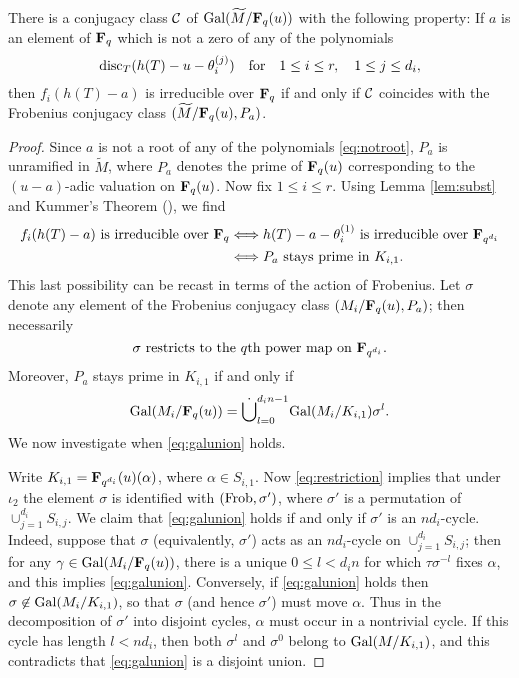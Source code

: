 \documentclass[a4paper]{compositio}
\begin{document}
\begin{lem}\label{lem:class} There is a conjugacy class $\mathcal{C}$ of $\mathrm{Gal}(\widetilde{M}/\mathbf{F}_{q}(u))$ with the following
property: If $a$ is an element of $\mathbf{F}_q$ which is not a zero of any
of the polynomials \begin{equation}\label{eq:notroot}
 \mathrm{disc}_{T}(h(T)-u-\theta_{i}^{(j)}) \quad \text{for}\quad  1 \leq i \leq
 r,\quad
1 \leq j \leq d_i, \end{equation} then $f_i(h(T)-a)$ is irreducible
over $\mathbf{F}_q$ if and only if $\mathcal{C}$ coincides with the Frobenius
conjugacy class $(\widetilde{M}/\mathbf{F}_{q}(u), P_a)$.
\end{lem}
\begin{proof} Since $a$ is not a root of any of the polynomials
\eqref{eq:notroot}, $P_a$ is unramified in $\widetilde{M}$, where
$P_a$ denotes the prime of $\mathbf{F}_q(u)$ corresponding to the
$(u-a)$-adic valuation on $\mathbf{F}_q(u)$. Now fix $1 \leq i \leq r$.
Using Lemma \ref{lem:subst} and Kummer's Theorem (\cite[Theorem
3.3.7]{stichtenoth93}), we find
\begin{align*}
 f_i(h(T)-a) \text{ is irreducible over $\mathbf{F}_q$} &\Longleftrightarrow
h(T) - a - \theta_i^{(1)} \text{ is irreducible over
$\mathbf{F}_{q^{d_i}}$} \\
&\Longleftrightarrow P_a \text{ stays prime in $K_{i,1}$}.
\end{align*}
This last possibility can be recast in terms of the action of
Frobenius. Let $\sigma$ denote any element of the Frobenius
conjugacy class $(M_i/\mathbf{F}_{q}(u), P_a)$; then necessarily
\begin{equation}\label{eq:restriction}
 \sigma \text{ restricts to the $q$th power map on
$\mathbf{F}_{q^{d_i}}$}. \end{equation} Moreover, $P_a$ stays prime in
$K_{i,1}$ if and only if
\begin{equation}\label{eq:galunion}
 \mathrm{Gal}(M_i/\mathbf{F}_q(u)) = \dot\bigcup_{l=0}^{d_i n -1}\mathrm{Gal}(M_i/K_{i,1})
\sigma^{l}. \end{equation} We now investigate when
\eqref{eq:galunion} holds.

Write $K_{i,1} = \mathbf{F}_{q^{d_i}}(u)(\alpha)$, where $\alpha \in
S_{i,1}$. Now \eqref{eq:restriction} implies that under $\iota_2$
the element $\sigma$ is identified with $(\mathrm{Frob}, \sigma')$, where
$\sigma'$ is a permutation of $\cup_{j=1}^{d_i}{S_{i,j}}$. We claim
that \eqref{eq:galunion} holds if and only if $\sigma'$ is an
$nd_i$-cycle. Indeed, suppose that $\sigma$ (equivalently,
$\sigma'$) acts as an $nd_i$-cycle on $\cup_{j=1}^{d_i}{S_{i,j}}$;
then for any $\gamma \in \mathrm{Gal}(M_i/\mathbf{F}_q(u))$, there is a unique $0
\leq l < d_i n$ for which $\tau \sigma^{-l}$ fixes $\alpha$, and
this implies \eqref{eq:galunion}. Conversely, if \eqref{eq:galunion}
holds then $\sigma \not\in \mathrm{Gal}(M_i/K_{i,1})$, so that $\sigma$ (and
hence $\sigma'$) must move $\alpha$. Thus in the decomposition of
$\sigma'$ into disjoint cycles, $\alpha$ must occur in a nontrivial
cycle. If this cycle has length $l < nd_i$, then both $\sigma^l$ and
$\sigma^0$ belong to $\mathrm{Gal}(M/K_{i,1})$, and this contradicts that
\eqref{eq:galunion} is a disjoint union.


\end{proof}
\end{document}
